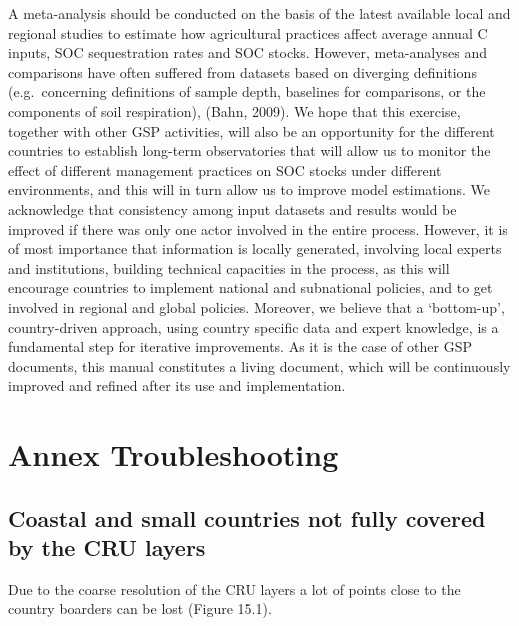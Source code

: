 \documentclass[
  10pt,
  b5paper,
]{book}
\begin{document}
A meta-analysis should be conducted on the basis of the latest available local and regional studies to estimate how agricultural practices affect average annual C inputs, SOC sequestration rates and SOC stocks. However, meta-analyses and comparisons have often suffered from datasets based on diverging definitions (e.g.~concerning definitions of sample depth, baselines for comparisons, or the components of soil respiration), (Bahn, 2009). We hope that this exercise, together with other GSP activities, will also be an opportunity for the different countries to establish long-term observatories that will allow us to monitor the effect of different management practices on SOC stocks under different environments, and this will in turn allow us to improve model estimations.
We acknowledge that consistency among input datasets and results would be improved if there was only one actor involved in the entire process. However, it is of most importance that information is locally generated, involving local experts and institutions, building technical capacities in the process, as this will encourage countries to implement national and subnational policies, and to get involved in regional and global policies. Moreover, we believe that a `bottom-up', country-driven approach, using country specific data and expert knowledge, is a fundamental step for iterative improvements. As it is the case of other GSP documents, this manual constitutes a living document, which will be continuously improved and refined after its use and implementation.

\hypertarget{annex-troubleshooting}{%
\chapter{Annex Troubleshooting}\label{annex-troubleshooting}}

\hypertarget{coastal-and-small-countries-not-fully-covered-by-the-cru-layers}{%
\section{Coastal and small countries not fully covered by the CRU layers}\label{coastal-and-small-countries-not-fully-covered-by-the-cru-layers}}

Due to the coarse resolution of the CRU layers a lot of points close to the country boarders can be lost (Figure 15.1).
\end{document}
